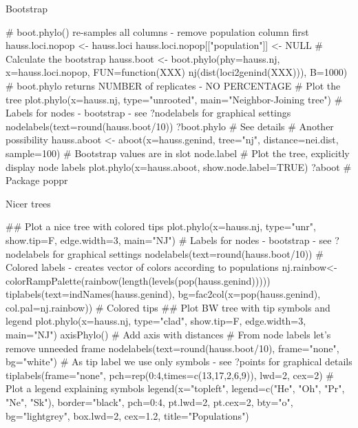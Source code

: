 \documentclass[compress, ucs, xelatex, 11pt, xcolor=svgnames,
	hyperref={
		bookmarks=true,
		unicode=true,
		colorlinks=true,
		pdftitle={Molecular data in R},
		plainpages=false,
		pdfauthor={Vojtech Zeisek},
		pdfsubject={Course about phylogeny and evolution in R},
		pdfcreator={XeLaTeX},
		pdfkeywords={R, evolution, phylogeny, molecular data},
		linkcolor=Tomato,
		anchorcolor=SaddleBrown,
		citecolor=Goldenrod,
		filecolor=DarkMagenta,
		menucolor=Sienna,
		urlcolor=DarkTurquoise,
		pdftex},
	url={hyphens, lowtilde} %
	]{beamer}
\begin{document}
\begin{frame}[fragile]{Bootstrap}
	\begin{spluscode}
    # boot.phylo() re-samples all columns - remove population column first
    hauss.loci.nopop <- hauss.loci
    hauss.loci.nopop[["population"]] <- NULL
    # Calculate the bootstrap
    hauss.boot <- boot.phylo(phy=hauss.nj, x=hauss.loci.nopop,
      FUN=function(XXX) nj(dist(loci2genind(XXX))), B=1000)
    # boot.phylo returns NUMBER of replicates - NO PERCENTAGE
    # Plot the tree
    plot.phylo(x=hauss.nj, type="unrooted", main="Neighbor-Joining tree")
    # Labels for nodes - bootstrap - see ?nodelabels for graphical settings
    nodelabels(text=round(hauss.boot/10))
    ?boot.phylo # See details
    # Another possibility
    hauss.aboot <- aboot(x=hauss.genind, tree="nj", distance=nei.dist,
      sample=100) # Bootstrap values are in slot node.label
    # Plot the tree, explicitly display node labels
    plot.phylo(x=hauss.aboot, show.node.label=TRUE)
    ?aboot # Package poppr
	\end{spluscode}
\end{frame}

\begin{frame}[fragile]{Nicer trees}
	\begin{spluscode}
    ## Plot a nice tree with colored tips
    plot.phylo(x=hauss.nj, type="unr", show.tip=F, edge.width=3, main="NJ")
    # Labels for nodes - bootstrap - see ?nodelabels for graphical settings
    nodelabels(text=round(hauss.boot/10))
    # Colored labels - creates vector of colors according to populations
    nj.rainbow<-colorRampPalette(rainbow(length(levels(pop(hauss.genind)))))
    tiplabels(text=indNames(hauss.genind), bg=fac2col(x=pop(hauss.genind),
      col.pal=nj.rainbow)) # Colored tips
    ## Plot BW tree with tip symbols and legend
    plot.phylo(x=hauss.nj, type="clad", show.tip=F, edge.width=3, main="NJ")
    axisPhylo() # Add axis with distances
    # From node labels let's remove unneeded frame
    nodelabels(text=round(hauss.boot/10), frame="none", bg="white")
    # As tip label we use only symbols - see ?points for graphical details
    tiplabels(frame="none", pch=rep(0:4,times=c(13,17,2,6,9)), lwd=2, cex=2)
    # Plot a legend explaining symbols
    legend(x="topleft", legend=c("He", "Oh", "Pr", "Ne", "Sk"),
      border="black", pch=0:4, pt.lwd=2, pt.cex=2, bty="o", bg="lightgrey",
      box.lwd=2, cex=1.2, title="Populations")
	\end{spluscode}
\end{frame}
\end{document}
